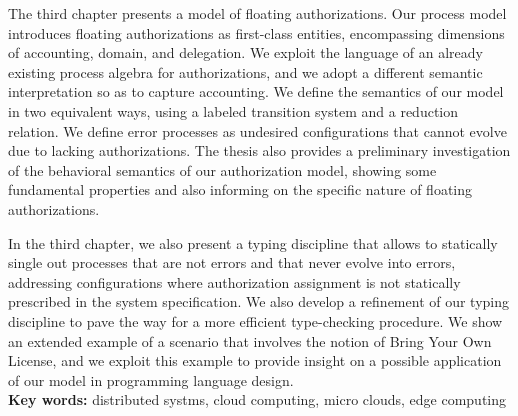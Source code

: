 The third chapter presents a model of floating authorizations. Our process model introduces floating authorizations as first-class entities, encompassing dimensions of accounting, domain, and delegation. 
We exploit the language of an already existing process algebra for authorizations, and we adopt a different semantic interpretation so as to capture accounting. We define the semantics of our model in two equivalent ways, using a labeled transition system and a reduction relation. %
We define error processes as undesired configurations that cannot evolve due to lacking authorizations. %
The thesis also provides a preliminary investigation of the behavioral semantics of our authorization model, showing some fundamental properties and also informing on the specific nature of floating authorizations. %

In the third chapter, we also  present a typing discipline that allows to statically single out processes that are not errors and that never evolve into errors, addressing configurations where authorization assignment
is not statically prescribed in the system specification. %
We also develop a refinement of our typing discipline to pave the way for a more efficient type-checking procedure. %
We show an extended example of a scenario that involves the notion of Bring Your Own License, and we exploit this example to provide insight on a possible application of our model in programming language design.\\
\newline
\textbf{Key words:} distributed systms, cloud computing, micro clouds, edge computing